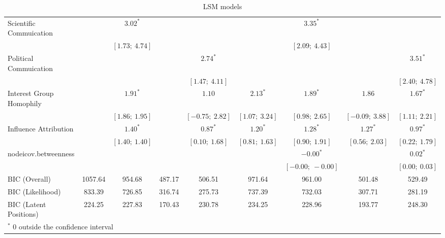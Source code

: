 \documentclass[fleqn,12pt]{wlscirep}
\begin{document}
\begin{landscape}
\begin{table}
\begin{center}
\begin{tabular}{l c c c c c c c c }
Scientific Commuication         &                  & $3.02^{*}$       &                  &                  &                  & $3.35^{*}$        &                  &                  \\
                        &                  & $[1.73;\ 4.74]$  &                  &                  &                  & $[2.09;\ 4.43]$   &                  &                  \\
Political Commuication          &                  &                  &                  & $2.74^{*}$       &                  &                   &                  & $3.51^{*}$       \\
                        &                  &                  &                  & $[1.47;\ 4.11]$  &                  &                   &                  & $[2.40;\ 4.78]$  \\
Interest Group Homophily       &                  & $1.91^{*}$       &                  & $1.10$           & $2.13^{*}$       & $1.89^{*}$        & $1.86$           & $1.67^{*}$       \\
                        &                  & $[1.86;\ 1.95]$  &                  & $[-0.75;\ 2.82]$ & $[1.07;\ 3.24]$  & $[0.98;\ 2.65]$   & $[-0.09;\ 3.88]$ & $[1.11;\ 2.21]$  \\
Influence Attribution       &                  & $1.40^{*}$       &                  & $0.87^{*}$       & $1.20^{*}$       & $1.28^{*}$        & $1.27^{*}$       & $0.97^{*}$       \\
                        &                  & $[1.40;\ 1.40]$  &                  & $[0.10;\ 1.68]$  & $[0.81;\ 1.63]$  & $[0.90;\ 1.91]$   & $[0.56;\ 2.03]$  & $[0.22;\ 1.79]$  \\
nodeicov.betweenness    &                  &                  &                  &                  &                  & $-0.00^{*}$       &                  & $0.02^{*}$       \\
                        &                  &                  &                  &                  &                  & $[-0.00;\ -0.00]$ &                  & $[0.00;\ 0.03]$  \\
\hline
BIC (Overall)           & 1057.64          & 954.68           & 487.17           & 506.51           & 971.64           & 961.00            & 501.48           & 529.49           \\
BIC (Likelihood)        & 833.39           & 726.85           & 316.74           & 275.73           & 737.39           & 732.03            & 307.71           & 281.19           \\
BIC (Latent Positions)  & 224.25           & 227.83           & 170.43           & 230.78           & 234.25           & 228.96            & 193.77           & 248.30           \\
\hline
\multicolumn{9}{l}{\scriptsize{$^*$ 0 outside the confidence interval}}
\end{tabular}
\caption{LSM models}
\label{table:coefficients}
\end{center}
\end{table}

\end{landscape}
\end{document}
